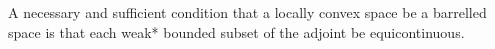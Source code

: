 A necessary and sufficient condition that a locally convex space be a barrelled space is that each weak* bounded subset of the adjoint be equicontinuous.
